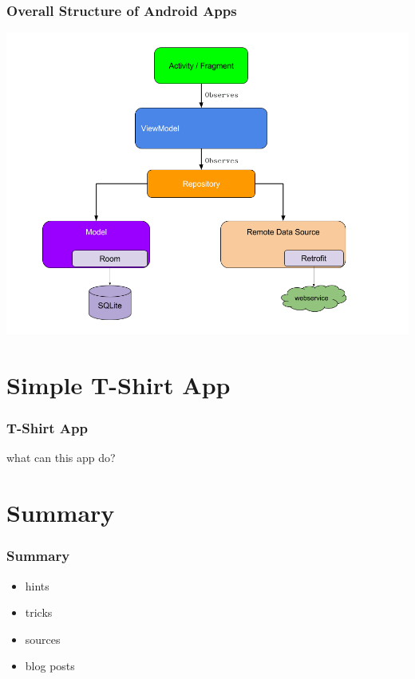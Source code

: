 \documentclass{beamer}
\begin{document}
	
	\begin{frame}
		\frametitle{Overall Structure of Android Apps}
		\includegraphics[width=1\textwidth]{architecture_observes.png}
	\end{frame}
	
	\section[My App]{Simple T-Shirt App}
	\begin{frame}
		\frametitle{T-Shirt App}
		what can this app do?
	\end{frame}
	
	\section[Summary]{Summary}
	\begin{frame}
		\frametitle{Summary}
		\begin{itemize}
		\item hints
		\item tricks
		\item sources
		\item blog posts
		\end{itemize}
	\end{frame}
\end{document}
